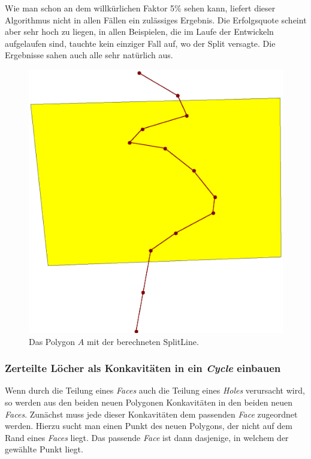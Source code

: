 Wie man schon an dem willkürlichen Faktor 5\% sehen kann, liefert dieser Algorithmus nicht in allen Fällen ein zulässiges Ergebnis. Die Erfolgsquote scheint aber sehr hoch zu liegen, in allen Beispielen, die im Laufe der Entwickeln aufgelaufen sind, tauchte kein einziger Fall auf, wo der Split versagte. Die Ergebnisse sahen auch alle sehr natürlich aus.


\begin{figure}
	\centering
	\includegraphics[scale=0.6]{Ergebnis.eps}
	\caption{Das Polygon $A$ mit der berechneten SplitLine.}
	\label{fig:SplitLine}
\end{figure}


\subsubsection{Zerteilte Löcher als Konkavitäten in ein \textit{Cycle} einbauen}\label{JoinLL}

Wenn durch die Teilung eines \textit{Faces} auch die Teilung eines \textit{Holes} verursacht wird, so werden aus den beiden neuen Polygonen Konkavitäten in den beiden neuen \textit{Faces}. Zunächst muss jede dieser Konkavitäten dem passenden \textit{Face} zugeordnet werden. Hierzu sucht man einen Punkt des neuen Polygons, der nicht auf dem Rand eines \textit{Faces} liegt. Das passende \textit{Face} ist dann dasjenige, in welchem der gewählte Punkt liegt. 

